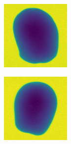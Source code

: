 \documentclass[11pt]{article}
\begin{document}
\begin{figure}[!h]
\begin{subfigure}[b]{0.22\textwidth}
         \caption{}
         \label{fig:perfect_25}
     \end{subfigure}
     \hfill
     \begin{subfigure}[b]{0.22\textwidth}
         \centering
         \includegraphics[width=\textwidth]{figurer/potato_dataset/perfect/perfect_26.jpg}
         \caption{}
         \label{fig:perfect_26}
     \end{subfigure}
     \hfill
     \begin{subfigure}[b]{0.22\textwidth}
         \centering
         \includegraphics[width=\textwidth]{figurer/potato_dataset/perfect/perfect_27.jpg}

\end{subfigure}
\end{figure}
\end{document}
